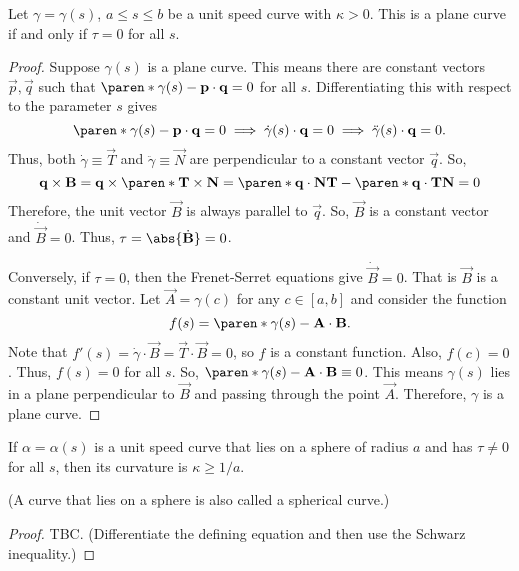 \documentclass[11pt]{penrose}
\newcommand{\vT}{\vec{T}}
\newcommand{\vN}{\vec{N}}
\newcommand{\vB}{\vec{B}}
\begin{document}
\begin{nthm}
    Let $\gamma = \gamma(s)$, $a \leq s \leq b$ be a unit speed curve with $\kappa > 0$. This is a plane curve if and only if $\tau = 0$ for all $s$.
\end{nthm}
\begin{proof}
    Suppose $\gamma(s)$ is a plane curve. This means there are constant vectors $\vec{p}, \vec{q}$ such that $\paren*{\gamma(s) - \vec{p}} \cdot \vec{q} = 0$ for all $s$. Differentiating this with respect to the parameter $s$ gives
    \begin{equation}
        \paren*{\gamma(s) - \vec{p}} \cdot \vec{q} = 0
        \implies
        \dot{\gamma}(s) \cdot \vec{q} = 0
        \implies
        \ddot{\gamma}(s) \cdot \vec{q} = 0.
    \end{equation}
    Thus, both $\dot{\gamma} \equiv \vT$ and $\ddot{\gamma} \equiv \vN$ are perpendicular to a constant vector $\vec{q}$. So,
    \begin{equation}
         \vec{q} \times \vB
        = \vec{q} \times \paren*{\vT \times \vN}
        = \paren*{\vec{q} \cdot \vN} \vT - \paren*{\vec{q} \cdot \vT} \vN
        = 0
    \end{equation}
    Therefore, the unit vector $\vB$ is always parallel to $\vec{q}$. So, $\vB$ is a constant vector and $\dot{\vB} = 0$. Thus, $\tau = \abs{\dot{\vB}} = 0$.

    Conversely, if $\tau = 0$, then the Frenet-Serret equations give $\dot{\vB} = 0$. That is $\vB$ is a constant unit vector. Let $\vec{A} = \gamma(c)$ for any $c \in [a, b]$ and consider the function
    \begin{equation}
        f(s) = \paren*{\gamma(s) - \vec{A}} \cdot \vB.
    \end{equation}
    Note that $f'(s) = \dot{\gamma} \cdot \vB = \vT \cdot \vB = 0$, so $f$ is a constant function. Also, $f(c) = 0$. Thus, $f(s) = 0$ for all $s$. So, $\paren*{\gamma(s) - \vec{A}} \cdot \vB \equiv 0$. This means $\gamma(s)$ lies in a plane perpendicular to $\vB$ and passing through the point $\vec{A}$. Therefore, $\gamma$ is a plane curve.
\end{proof}

\begin{nthm}
    If $\alpha = \alpha(s)$ is a unit speed curve that lies on a sphere of radius $a$ and has $\tau \neq 0$ for all $s$, then its curvature is $\kappa \geq 1/a$.

    (A curve that lies on a sphere is also called a spherical curve.)
\end{nthm}
\begin{proof}
    TBC. (Differentiate the defining equation and then use the Schwarz inequality.)
\end{proof}
\end{document}

